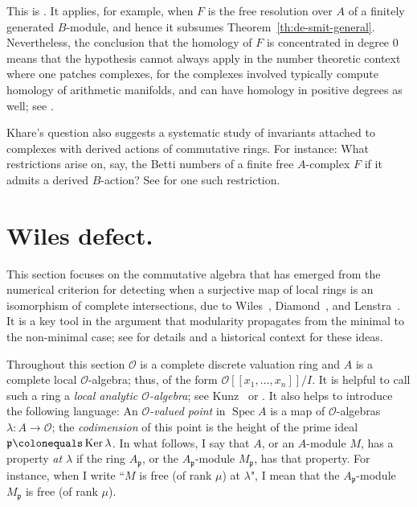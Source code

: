 \documentclass[twoside,leqno]{article}
\newcommand{\fp}{{\mathfrak p}}
\newcommand{\Ker}{\operatorname{Ker}}
\newcommand{\mco}{\mathcal O}
\newcommand{\pos}[1]{[\![{#1}]\!]}
\newcommand{\Spec}{\operatorname{Spec}}
\begin{document}
This is \cite[Theorem~1.2]{Brochard/Iyengar/Khare:2025}.  It applies, for example, when $F$ is the free resolution over $A$ of a finitely generated $B$-module, and hence it subsumes Theorem~\ref{th:de-smit-general}. Nevertheless, the conclusion that the homology of $F$ is concentrated in degree $0$ means that the hypothesis cannot always apply in the number theoretic context where one patches complexes, for the complexes involved  typically compute homology of arithmetic manifolds, and can have homology in positive degrees as well; see \cite[Section~5]{Brochard/Iyengar/Khare:2025}.

Khare's question also suggests a systematic study of invariants attached to complexes with derived actions of commutative rings. For instance: What restrictions arise on, say, the Betti numbers of a finite free $A$-complex $F$ if it admits a derived $B$-action? See \cite[Lemma~10.7]{Iyengar/Khare/Manning:2024a} for one such restriction.


\section{Wiles defect.}
\label{se:wilesdefect}
This section focuses on the commutative algebra that has emerged from the numerical criterion for detecting when a surjective map of local rings is an isomorphism of complete intersections, due to Wiles~\cite{Wiles:1995}, Diamond~\cite{Diamond:1997}, and Lenstra~\cite{Lenstra:1995}. It is a key tool in the argument that modularity propagates from the minimal to the non-minimal case;  see \cite[Introduction]{Iyengar/Khare/Manning:2024a} for details and a historical context for these ideas. 

Throughout this section $\mco$ is a complete discrete valuation ring and $A$ is a complete local $\mco$-algebra; thus, of the  form $\mco\pos{x_1,\dots,x_n}/I$. It is helpful to call such a ring a \emph{local analytic $\mco$-algebra}; see Kunz~\cite[\S13]{Kunz:1986} or \cite{Berger/Kiehl/Kunz/Nastold:1967}. It also helps to introduce the following language: An \emph{$\mco$-valued point} in $\Spec A$ is a map of $\mco$-algebras $\lambda\colon A\to \mco$; the \emph{codimension} of this point is the height of the prime ideal $\fp\colonequals \Ker\lambda$. In what follows, I say that  $A$, or an $A$-module $M$, has a property \emph{at $\lambda$} if the ring $A_\fp$, or the $A_\fp$-module $M_\fp$, has that property. For instance, when I write ``$M$ is free (of rank $\mu$) at $\lambda$", I mean that the $A_\fp$-module $M_\fp$ is free (of rank $\mu$).
\end{document}
